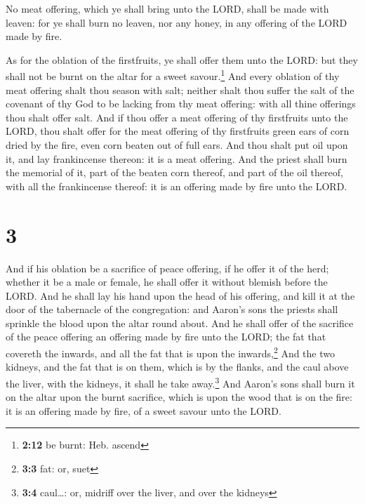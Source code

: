  No meat offering, which ye shall bring unto the LORD,
shall be made with leaven: for ye shall burn no leaven, nor any honey,
in any offering of the LORD made by fire.

 As for the oblation of the firstfruits, ye shall offer
them unto the LORD: but they shall not be burnt on the altar for a sweet
savour.\footnote{\textbf{2:12} be burnt: Heb. ascend} 
And every oblation of thy meat offering shalt thou season with salt;
neither shalt thou suffer the salt of the covenant of thy God to be
lacking from thy meat offering: with all thine offerings thou shalt
offer salt.  And if thou offer a meat offering of thy
firstfruits unto the LORD, thou shalt offer for the meat offering of thy
firstfruits green ears of corn dried by the fire, even corn beaten out
of full ears.  And thou shalt put oil upon it, and lay
frankincense thereon: it is a meat offering.  And the
priest shall burn the memorial of it, part of the beaten corn thereof,
and part of the oil thereof, with all the frankincense thereof: it is an
offering made by fire unto the LORD.

\hypertarget{section-2}{%
\section{3}\label{section-2}}

 And if his oblation be a sacrifice of peace offering, if
he offer it of the herd; whether it be a male or female, he shall offer
it without blemish before the LORD.  And he shall lay his
hand upon the head of his offering, and kill it at the door of the
tabernacle of the congregation: and Aaron's sons the priests shall
sprinkle the blood upon the altar round about.  And he
shall offer of the sacrifice of the peace offering an offering made by
fire unto the LORD; the fat that covereth the inwards, and all the fat
that is upon the inwards,\footnote{\textbf{3:3} fat: or, suet}
 And the two kidneys, and the fat that is on them, which
is by the flanks, and the caul above the liver, with the kidneys, it
shall he take away.\footnote{\textbf{3:4} caul\ldots: or, midriff over
  the liver, and over the kidneys}  And Aaron's sons shall
burn it on the altar upon the burnt sacrifice, which is upon the wood
that is on the fire: it is an offering made by fire, of a sweet savour
unto the LORD.

